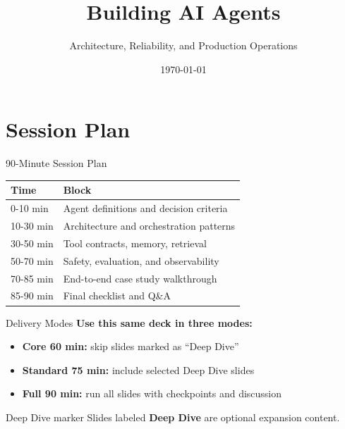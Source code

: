\documentclass[aspectratio=169]{beamer}
\title{Building AI Agents}
\subtitle{Architecture, Reliability, and Production Operations}
\date{\today}
\begin{document}
\begin{frame}
  \titlepage
\end{frame}

\tocslide

\section{Session Plan}

\begin{frame}{90-Minute Session Plan}
  \begin{table}
    \small
    \begin{tabular}{@{}ll@{}}
      \toprule
      Time & Block \\
      \midrule
      0-10 min & Agent definitions and decision criteria \\
      10-30 min & Architecture and orchestration patterns \\
      30-50 min & Tool contracts, memory, retrieval \\
      50-70 min & Safety, evaluation, and observability \\
      70-85 min & End-to-end case study walkthrough \\
      85-90 min & Final checklist and Q\&A \\
      \bottomrule
    \end{tabular}
  \end{table}
\end{frame}

\begin{frame}{Delivery Modes}
  \textbf{Use this same deck in three modes:}
  \begin{itemize}
    \item \textbf{Core 60 min:} skip slides marked as ``Deep Dive''
    \item \textbf{Standard 75 min:} include selected Deep Dive slides
    \item \textbf{Full 90 min:} run all slides with checkpoints and discussion
  \end{itemize}

  \vspace{0.5em}
  \begin{block}{Deep Dive marker}
    Slides labeled \textbf{Deep Dive} are optional expansion content.
  \end{block}
\end{frame}
\end{document}

